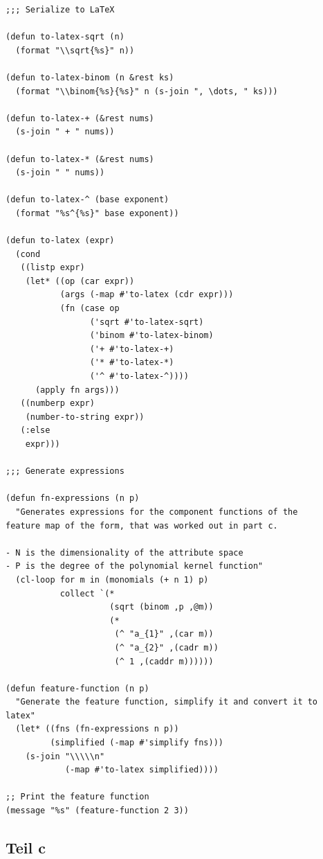\documentclass[10pt,a4paper]{article}
\begin{document}
\begin{lstlisting}
;;; Serialize to LaTeX

(defun to-latex-sqrt (n)
  (format "\\sqrt{%s}" n))

(defun to-latex-binom (n &rest ks)
  (format "\\binom{%s}{%s}" n (s-join ", \dots, " ks)))

(defun to-latex-+ (&rest nums)
  (s-join " + " nums))

(defun to-latex-* (&rest nums)
  (s-join " " nums))

(defun to-latex-^ (base exponent)
  (format "%s^{%s}" base exponent))

(defun to-latex (expr)
  (cond
   ((listp expr)
    (let* ((op (car expr))
           (args (-map #'to-latex (cdr expr)))
           (fn (case op
                 ('sqrt #'to-latex-sqrt)
                 ('binom #'to-latex-binom)
                 ('+ #'to-latex-+)
                 ('* #'to-latex-*)
                 ('^ #'to-latex-^))))
      (apply fn args)))
   ((numberp expr)
    (number-to-string expr))
   (:else
    expr)))

;;; Generate expressions

(defun fn-expressions (n p)
  "Generates expressions for the component functions of the
feature map of the form, that was worked out in part c.

- N is the dimensionality of the attribute space
- P is the degree of the polynomial kernel function"
  (cl-loop for m in (monomials (+ n 1) p)
           collect `(*
                     (sqrt (binom ,p ,@m))
                     (*
                      (^ "a_{1}" ,(car m))
                      (^ "a_{2}" ,(cadr m))
                      (^ 1 ,(caddr m))))))

(defun feature-function (n p)
  "Generate the feature function, simplify it and convert it to
latex"
  (let* ((fns (fn-expressions n p))
         (simplified (-map #'simplify fns)))
    (s-join "\\\\\n"
            (-map #'to-latex simplified))))

;; Print the feature function
(message "%s" (feature-function 2 3))
\end{lstlisting}

\subsection{Teil c}
\end{document}
